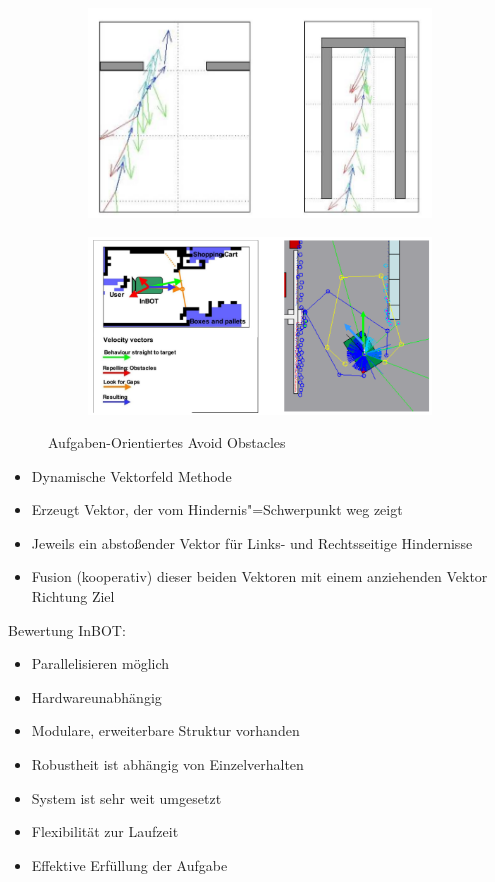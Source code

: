 \begin{figure}[h!]
	\centering
	\begin{subfigure}{.4\textwidth}
		\centering
		\includegraphics[width=\textwidth]{figures/objekt_level_hindernis.png}
	\end{subfigure}
	\begin{subfigure}{.4\textwidth}
		\centering
		\includegraphics[width=\textwidth]{figures/objekt_level_hindernis_1.png}
	\end{subfigure}
	\caption{Aufgaben-Orientiertes Avoid Obstacles}
	\label{ch:08:fig:objekt-orientiert-hindernis}
\end{figure}
\begin{itemize}
	\item Dynamische Vektorfeld Methode
	\item Erzeugt Vektor, der vom Hindernis"=Schwerpunkt weg zeigt
	\item Jeweils ein abstoßender Vektor für Links- und Rechtsseitige Hindernisse
	\item Fusion (kooperativ) dieser beiden Vektoren mit einem anziehenden Vektor Richtung Ziel
\end{itemize}

Bewertung InBOT:
\begin{itemize}
	\item Parallelisieren möglich
	\item Hardwareunabhängig
	\item Modulare, erweiterbare Struktur vorhanden
	\item Robustheit ist abhängig von Einzelverhalten
	\item System ist sehr weit umgesetzt
	\item Flexibilität zur Laufzeit
	\item Effektive Erfüllung der Aufgabe
\end{itemize}